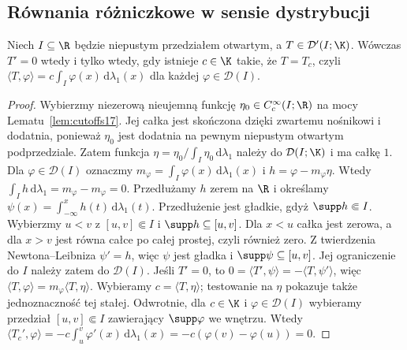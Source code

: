 \subsection{Równania różniczkowe w sensie dystrybucji}

\begin{twierdzenie}
\label{thm:zero-derivative20}
Niech $I\subseteq\R$ będzie niepustym przedziałem otwartym,
a $T\in\mathcal D'(I;\K)$. Wówczas $T'=0$
wtedy i tylko wtedy, gdy istnieje $c\in\K$ takie, że
$T=T_c$, czyli
$\langle T,\varphi\rangle=c\int_I\varphi(x)\,\mathrm d\lambda_1(x)$
dla każdej $\varphi\in\mathcal D(I)$.
\end{twierdzenie}
\begin{proof}
Wybierzmy niezerową nieujemną funkcję
$\eta_0\in C_c^\infty(I;\R)$ na mocy
Lematu~\ref{lem:cutoffs17}. Jej całka jest skończona
dzięki zwartemu nośnikowi i dodatnia, ponieważ $\eta_0$
jest dodatnia na pewnym niepustym otwartym podprzedziale.
Zatem
funkcja $\eta=\eta_0/\int_I\eta_0\,\mathrm d\lambda_1$
należy do $\mathcal D(I;\K)$ i ma całkę $1$.
Dla $\varphi\in\mathcal D(I)$ oznaczmy
$m_\varphi=\int_I\varphi(x)\,\mathrm d\lambda_1(x)$
i $h=\varphi-m_\varphi\eta$. Wtedy
$\int_I h\,\mathrm d\lambda_1=m_\varphi-m_\varphi=0$.
Przedłużamy $h$ zerem na $\R$ i określamy
$\psi(x)=\int_{-\infty}^xh(t)\,\mathrm d\lambda_1(t)$.
Przedłużenie jest gładkie, gdyż $\supp h\Subset I$.
Wybierzmy $u<v$ z $[u,v]\Subset I$ i
$\supp h\subseteq[u,v]$. Dla $x<u$ całka jest zerowa,
a dla $x>v$ jest równa całce po całej prostej, czyli również
zero. Z twierdzenia Newtona--Leibniza $\psi'=h$,
więc $\psi$ jest gładka i $\supp\psi\subseteq[u,v]$.
Jej ograniczenie do $I$ należy zatem do $\mathcal D(I)$. Jeśli $T'=0$, to
$0=\langle T',\psi\rangle=-\langle T,\psi'\rangle$,
więc $\langle T,\varphi\rangle=m_\varphi\langle T,\eta\rangle$.
Wybieramy $c=\langle T,\eta\rangle$; testowanie na $\eta$
pokazuje także jednoznaczność tej stałej.
Odwrotnie, dla $c\in\K$ i $\varphi\in\mathcal D(I)$
wybieramy przedział $[u,v]\Subset I$ zawierający
$\supp\varphi$ we wnętrzu. Wtedy
$\langle T_c',\varphi\rangle=-c\int_u^v\varphi'(x)\,
\mathrm d\lambda_1(x)=-c(\varphi(v)-\varphi(u))=0$.
\end{proof}

